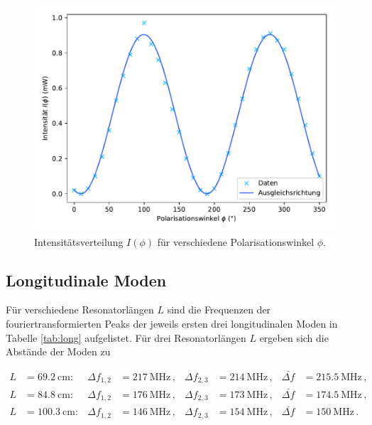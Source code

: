 \vspace{-15pt}

\begin{figure}[H]
    \centering
    \includegraphics[scale=0.65]{content/pol.pdf}
    \vspace{-10pt}
    \caption{Intensitätsverteilung $I(\phi)$ für verschiedene Polarisationswinkel $\phi$.}
    \label{fig:pol}
\end{figure}

\subsection{Longitudinale Moden}

Für verschiedene Resonatorlängen $L$ sind die Frequenzen der fouriertransformierten Peaks der
jeweils ersten drei longitudinalen Moden in Tabelle \ref{tab:long} aufgelistet.
Für drei Resonatorlängen $L$ ergeben sich die Abstände der Moden zu

\vspace{-15pt}
\begin{align*}
    L &= \SI{ 69.2}{\centi\meter}: & \Delta f_{1,2} &= \SI{217}{\mega\hertz}\, , & \Delta f_{2,3 } &= \SI{214}{\mega\hertz}\, , & \bar{\Delta f} &= \SI{215.5}{\mega\hertz}\, , \\  
    L &= \SI{ 84.8}{\centi\meter}: & \Delta f_{1,2} &= \SI{176}{\mega\hertz}\, , & \Delta f_{2,3 } &= \SI{173}{\mega\hertz}\, , & \bar{\Delta f} &= \SI{174.5}{\mega\hertz}\, , \\  
    L &= \SI{100.3}{\centi\meter}: & \Delta f_{1,2} &= \SI{146}{\mega\hertz}\, , & \Delta f_{2,3 } &= \SI{154}{\mega\hertz}\, , & \bar{\Delta f} &= \SI{150}{\mega\hertz}\, .  
\end{align*}


